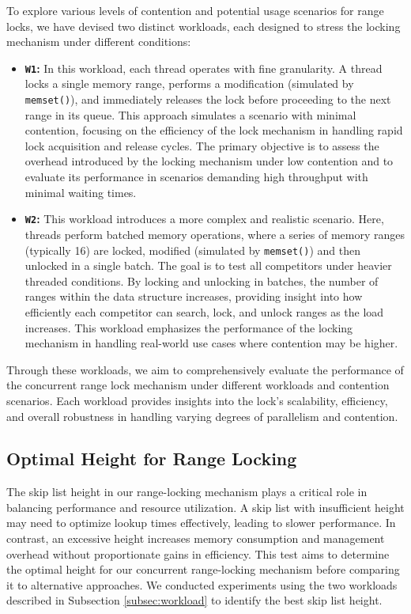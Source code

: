 To explore various levels of contention and potential usage scenarios for range locks, we have devised two distinct workloads, each designed to stress the locking mechanism under different conditions:

\begin{itemize} 
    \item \textbf{\texttt{W1}:} In this workload, each thread operates with fine granularity. 
    A thread locks a single memory range, performs a modification (simulated by \texttt{memset()}), and immediately releases the lock before proceeding to the next range in its queue. 
    This approach simulates a scenario with minimal contention, focusing on the efficiency of the lock mechanism in handling rapid lock acquisition and release cycles. 
    The primary objective is to assess the overhead introduced by the locking mechanism under low contention and to evaluate its performance in scenarios demanding high throughput with minimal waiting times.
    
    \item \textbf{\texttt{W2}:} This workload introduces a more complex and realistic scenario. 
    Here, threads perform batched memory operations, where a series of memory ranges (typically 16) are locked, modified (simulated by \texttt{memset()}) and then unlocked in a single batch. 
    The goal is to test all competitors under heavier threaded conditions. 
    By locking and unlocking in batches, the number of ranges within the data structure increases, providing insight into how efficiently each competitor can search, lock, and unlock ranges as the load increases. 
    This workload emphasizes the performance of the locking mechanism in handling real-world use cases where contention may be higher.
\end{itemize}

Through these workloads, we aim to comprehensively evaluate the performance of the concurrent range lock mechanism under different workloads and contention scenarios. 
Each workload provides insights into the lock's scalability, efficiency, and overall robustness in handling varying degrees of parallelism and contention.

\subsection{Optimal Height for Range Locking}

The skip list height in our range-locking mechanism plays a critical role in balancing performance and resource utilization. 
A skip list with insufficient height may need to optimize lookup times effectively, leading to slower performance. 
In contrast, an excessive height increases memory consumption and management overhead without proportionate gains in efficiency. 
This test aims to determine the optimal height for our concurrent range-locking mechanism before comparing it to alternative approaches. 
We conducted experiments using the two workloads described in Subsection \ref{subsec:workload} to identify the best skip list height.

